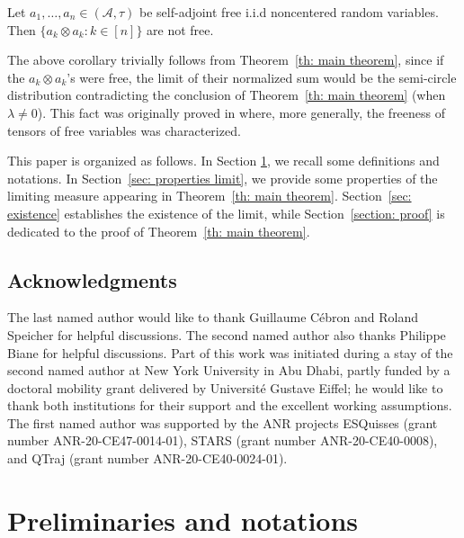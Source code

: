 \documentclass[12pt,reqno]{amsart}
\theoremstyle{plain}
\newcommand{\1}{\mathbf{1}}
\newcommand{\A}{\mathcal{A}}
\begin{document}
\begin{corollary}\label{cor: non freeness of tensor products}
    Let $a_1,\ldots,a_n \in (\A,\tau)$ be self-adjoint free i.i.d noncentered random variables. 
Then $\{a_k\otimes a_k: k \in [n]\}$ are not free.
\end{corollary}
The above corollary trivially follows from Theorem~\ref{th: main theorem}, since if the $a_k\otimes a_k$'s were free, the limit of their normalized sum would be the semi-circle distribution contradicting the conclusion of Theorem~\ref{th: main theorem} (when $\lambda\neq 0$). This fact was originally proved in \cite{collins2017freeness} where, more generally, the freeness of tensors of free variables was characterized.  





This paper is organized as follows. In Section \ref{sec: prelim}, we recall some definitions and notations. In Section~\ref{sec: properties limit}, we provide some properties of the limiting measure appearing in Theorem~\ref{th: main theorem}. Section~\ref{sec: existence} establishes the existence of the limit, while Section~\ref{section: proof} is dedicated to the proof of Theorem~\ref{th: main theorem}.  


\subsection*{Acknowledgments} 
The last named author would like to thank Guillaume C\'ebron and Roland Speicher for helpful discussions. The second named author also thanks Philippe Biane for helpful discussions. Part of this work was initiated during a stay of the second named author at New York University in Abu Dhabi, partly funded by a doctoral mobility grant delivered by Universit\'e Gustave Eiffel; he would like to thank both institutions for their support and the excellent working assumptions. The first named author was supported by the ANR projects ESQuisses (grant number ANR-20-CE47-0014-01), STARS (grant number ANR-20-CE40-0008), and QTraj (grant number ANR-20-CE40-0024-01).

\section{Preliminaries and notations}\label{sec: prelim}
\end{document}
